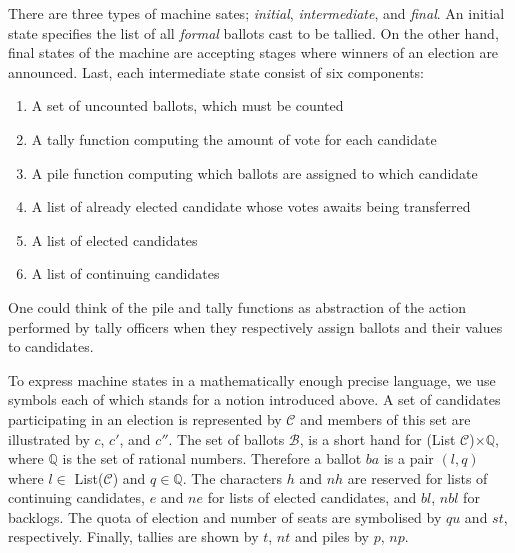 \documentclass{llncs}
\begin{document}
There are three types of machine sates; \emph{initial}, \emph{intermediate}, and \emph{final}. An initial state specifies the list of all \emph{formal} ballots cast to be tallied. On the other hand, final states of the machine are accepting stages where winners of an election are announced. Last, each intermediate state consist of six components:
\begin{enumerate}
\item A set of uncounted ballots, which must be counted
\item A tally function computing the amount of vote for each candidate
\item A pile function computing which ballots are assigned to which candidate
\item A list of already elected candidate whose votes awaits being transferred
\item A list of elected candidates
\item A list of continuing candidates 
\end{enumerate}  
One could think of  the pile and tally functions as abstraction of the action performed by tally officers when they respectively assign ballots and their values to candidates.


To express machine states in a mathematically enough precise language, we use symbols each of which stands for a notion introduced above. A set of candidates participating in an election is represented by $\mathcal{C}$ and members of this set are illustrated by $c$, $c'$, and $c''$. The set of ballots $\mathcal{B}$, is a short hand for (\textsf{List} $\mathcal{C}$)$\times\mathbb{Q}$, where $\mathbb{Q}$ is the set of rational numbers. Therefore a ballot $ba$ is a pair $(l,q)$ where $l\in$ \textsf{List}($\mathcal{C}$) and $q\in\mathbb{Q}$. The characters $h$ and $nh$ are reserved for lists of continuing candidates, $e$ and $ne$ for lists of elected candidates, and $bl$, $nbl$ for backlogs. The quota of election and number of seats are symbolised by $qu$ and $st$, respectively. Finally, tallies are shown by $t$, $nt$ and piles by $p$, $np$.  
\end{document}

